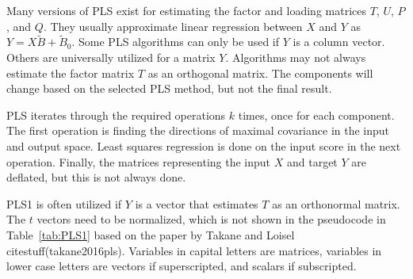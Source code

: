 \documentclass[preprint,12pt]{elsarticle}
\begin{document}
Many versions of PLS exist for estimating the factor and loading matrices $T$, $U$, $P$, and $Q$. They usually approximate linear regression between $X$ and $Y$ as $Y=X{\tilde{B}}+{\tilde{B}}_{0}$. Some PLS algorithms can only be used if $Y$ is a column vector. Others are universally utilized for a matrix $Y$. Algorithms may not always estimate the factor matrix $T$ as an orthogonal matrix. The components will change based on the selected PLS method, but not the final result.

PLS iterates through the required operations $k$ times, once for each component. The first operation is finding the directions of maximal covariance in the input and output space. Least squares regression is done on the input score in the next operation. Finally, the matrices representing the input $X$ and target $Y$ are deflated, but this is not always done.

PLS1 is often utilized if $Y$ is a vector that estimates $T$ as an orthonormal matrix. The $t$ vectors need to be normalized, which is not shown in the pseudocode in Table~\ref{tab:PLS1} based on the paper by Takane and Loisel citestuff(takane2016pls). Variables in capital letters are matrices, variables in lower case letters are vectors if superscripted, and scalars if subscripted.
\end{document}
